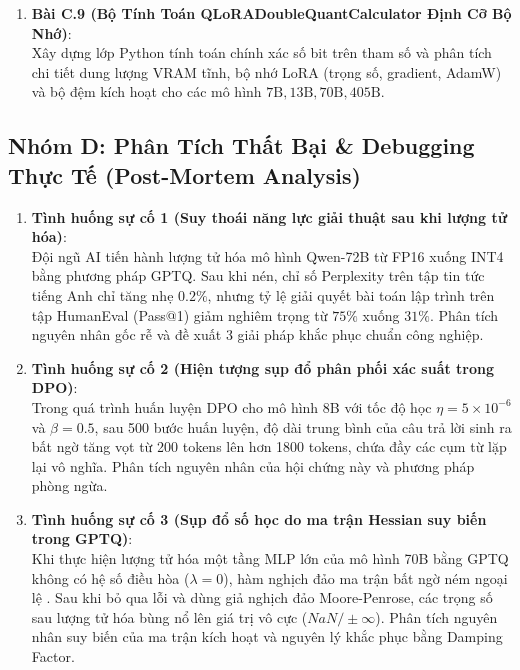 \begin{enumerate}
  \item \textbf{Bài C.9 (Bộ Tính Toán QLoRADoubleQuantCalculator Định Cỡ Bộ Nhớ)}: \\
  Xây dựng lớp Python  tính toán chính xác số bit trên tham số và phân tích chi tiết dung lượng VRAM tĩnh, bộ nhớ LoRA (trọng số, gradient, AdamW) và bộ đệm kích hoạt cho các mô hình $7\text{B}, 13\text{B}, 70\text{B}, 405\text{B}$.
\end{enumerate}

\subsection{Nhóm D: Phân Tích Thất Bại \& Debugging Thực Tế (Post-Mortem Analysis)}
\begin{enumerate}
  \item \textbf{Tình huống sự cố 1 (Suy thoái năng lực giải thuật sau khi lượng tử hóa)}: \\
  Đội ngũ AI tiến hành lượng tử hóa mô hình Qwen-72B từ FP16 xuống INT4 bằng phương pháp GPTQ. Sau khi nén, chỉ số Perplexity trên tập tin tức tiếng Anh chỉ tăng nhẹ $0.2\%$, nhưng tỷ lệ giải quyết bài toán lập trình trên tập HumanEval (Pass@1) giảm nghiêm trọng từ $75\%$ xuống $31\%$. Phân tích nguyên nhân gốc rễ và đề xuất 3 giải pháp khắc phục chuẩn công nghiệp.

  \item \textbf{Tình huống sự cố 2 (Hiện tượng sụp đổ phân phối xác suất trong DPO)}: \\
  Trong quá trình huấn luyện DPO cho mô hình 8B với tốc độ học $\eta = 5 \times 10^{-6}$ và $\beta = 0.5$, sau 500 bước huấn luyện, độ dài trung bình của câu trả lời sinh ra bất ngờ tăng vọt từ 200 tokens lên hơn 1800 tokens, chứa đầy các cụm từ lặp lại vô nghĩa. Phân tích nguyên nhân của hội chứng này và phương pháp phòng ngừa.

  \item \textbf{Tình huống sự cố 3 (Sụp đổ số học do ma trận Hessian suy biến trong GPTQ)}: \\
  Khi thực hiện lượng tử hóa một tầng MLP lớn của mô hình 70B bằng GPTQ không có hệ số điều hòa ($\lambda = 0$), hàm nghịch đảo ma trận  bất ngờ ném ngoại lệ . Sau khi bỏ qua lỗi và dùng giả nghịch đảo Moore-Penrose, các trọng số sau lượng tử hóa bùng nổ lên giá trị vô cực ($NaN / \pm\infty$). Phân tích nguyên nhân suy biến của ma trận kích hoạt và nguyên lý khắc phục bằng Damping Factor.
\end{enumerate}


